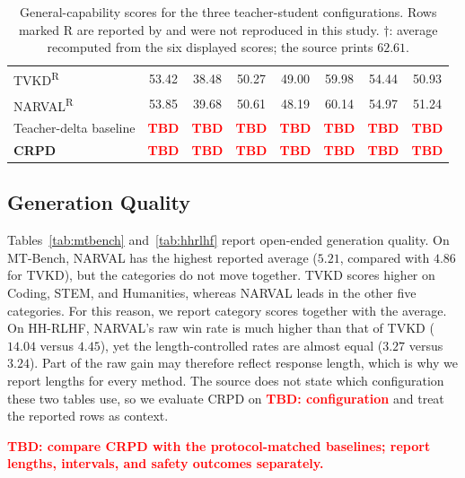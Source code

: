\documentclass[pdflatex,sn-mathphys-num,review]{sn-jnl}
\theoremstyle{thmstyleone}
\theoremstyle{thmstyletwo}
\theoremstyle{thmstylethree}
\providecommand{\muhat}{\widehat{\mu}}
\newcommand{\tbd}[1][]{\textcolor{red}{\textbf{TBD#1}}}
\begin{document}
\begin{table}[t]
{\begin{tabular}{lccccccc}
TVKD\textsuperscript{R} & 53.42 & 38.48 & 50.27 & 49.00 & 59.98 & 54.44 & 50.93 \\
NARVAL\textsuperscript{R} & 53.85 & 39.68 & 50.61 & 48.19 & 60.14 & 54.97 & 51.24 \\
Teacher-delta baseline & \tbd & \tbd & \tbd & \tbd & \tbd & \tbd & \tbd \\
\rowcolor{gray!20}
\textbf{CRPD} & \tbd & \tbd & \tbd & \tbd & \tbd & \tbd & \tbd \\
\bottomrule
\end{tabular}
}
\caption{General-capability scores for the three teacher-student configurations. Rows marked R are reported by \citet{van2026narval} and were not reproduced in this study. $\dagger$: average recomputed from the six displayed scores; the source prints $62.61$.}
\label{tab:main}
\end{table}

\subsection{Generation Quality}
\label{subsec:generation}

Tables~\ref{tab:mtbench} and~\ref{tab:hhrlhf} report open-ended generation quality. On MT-Bench, NARVAL has the highest reported average ($5.21$, compared with $4.86$ for TVKD), but the categories do not move together. TVKD scores higher on Coding, STEM, and Humanities, whereas NARVAL leads in the other five categories. For this reason, we report category scores together with the average. On HH-RLHF, NARVAL's raw win rate is much higher than that of TVKD ($14.04$ versus $4.45$), yet the length-controlled rates are almost equal ($3.27$ versus $3.24$). Part of the raw gain may therefore reflect response length, which is why we report lengths for every method. The source does not state which configuration these two tables use, so we evaluate CRPD on \tbd[: configuration] and treat the reported rows as context.

\tbd[: compare CRPD with the protocol-matched baselines; report lengths, intervals, and safety outcomes separately.]
\end{document}
